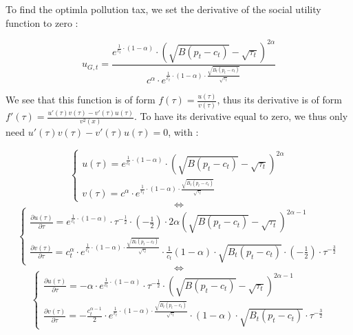 \documentclass{article}
\begin{document}
To find the optimla pollution tax, we set the derivative of the social utility function to zero : 

$$u_{G,t}=\frac{e^{\frac{1}{c_{t}}\cdot\left(1-\alpha\right)}\cdot\left(\sqrt{B(p_{t}-c_{t})}-\sqrt{\tau_{t}}\right)^{2\alpha}}{c^{\alpha}\cdot e^{\frac{1}{c_{t}}\cdot(1-\alpha)\cdot\frac{\sqrt{B_{t}(p_{t}-c_{t})}}{\sqrt{\tau_{t}}}}}$$

We see that this function is of form $f(\tau)=\frac{u(\tau)}{v(\tau)}$, thus its derivative is of form $f'(\tau)=\frac{u'(\tau)v(\tau)-v'(\tau)u(\tau)}{v^2(x)}$. To have its derivative equal to zero, we thus only need $u'(\tau)v(\tau)-v'(\tau)u(\tau)=0$, with :

\begin{equation*}
    \begin{cases}
        u(\tau)= e^{\frac{1}{c_{t}}\cdot\left(1-\alpha\right)}\cdot\left(\sqrt{B(p_{t}-c_{t})}-\sqrt{\tau_{t}}\right)^{2\alpha} \\
        v(\tau)= c^{\alpha}\cdot e^{\frac{1}{c_{t}}\cdot(1-\alpha)\cdot\frac{\sqrt{B_{t}(p_{t}-c_{t})}}{\sqrt{\tau_{t}}}}
    \end{cases}
\end{equation*}
$$\iff$$
\begin{equation*}
    \begin{cases}
        \frac{\partial u(\tau)}{\partial \tau}= e^{\frac{1}{c_{t}}\cdot\left(1-\alpha\right)}\cdot \tau^{-\frac{1}{2}}\cdot \left(-\frac{1}{2}\right)\cdot 2\alpha \left(\sqrt{B(p_{t}-c_{t})}-\sqrt{\tau_{t}}\right)^{2\alpha-1} \\
        \frac{\partial v(\tau)}{\partial \tau}= c_{t}^{\alpha}\cdot e^{\frac{1}{c_{t}}\cdot(1-\alpha)\cdot\frac{\sqrt{B_{t}(p_{t}-c_{t})}}{\sqrt{\tau_{t}}}}\cdot \frac{1}{c_{t}}(1-\alpha)\cdot\sqrt{B_{t}(p_{t}-c_{t})}\cdot\left(-\frac{1}{2}\right)\cdot\tau^{-\frac{3}{2}}
    \end{cases}
\end{equation*}
$$\iff$$
\begin{equation*}
    \begin{cases}
        \frac{\partial u(\tau)}{\partial \tau}= -\alpha\cdot e^{\frac{1}{c_{t}}\cdot\left(1-\alpha\right)}\cdot \tau^{-\frac{1}{2}}\cdot \left(\sqrt{B(p_{t}-c_{t})}-\sqrt{\tau_{t}}\right)^{2\alpha-1} \\
        \frac{\partial v(\tau)}{\partial \tau}= -\frac{c_{t}^{\alpha-1}}{2}\cdot e^{\frac{1}{c_{t}}\cdot(1-\alpha)\cdot\frac{\sqrt{B_{t}(p_{t}-c_{t})}}{\sqrt{\tau_{t}}}}\cdot (1-\alpha)\cdot\sqrt{B_{t}(p_{t}-c_{t})}\cdot\tau^{-\frac{3}{2}}
    \end{cases}
\end{equation*}
\end{document}
